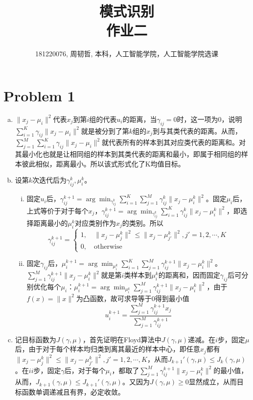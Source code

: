 \documentclass[a4paper,UTF8]{article}
\numberwithin{equation}{section}
\begin{document}
\title{模式识别\\
作业二}
\author{181220076, 周韧哲, 本科，人工智能学院，人工智能学院选课}
\maketitle

\section*{Problem 1}
\begin{enumerate}[(a)]
	\item $\|x_j-\mu_i\|^2$代表$x_j$到第$i$组的代表$u_i$的距离，当$\gamma_{ij}=0$时，这一项为$0$，说明$\sum_{i=1}^{K}\gamma_{ij}\|x_j-\mu_i\|^2$就是被分到了第$k$组的$x_j$到与其类代表的距离。从而，$\sum_{j=1}^{M}\sum_{i=1}^{K}\gamma_{ij}\|x_j-\mu_i\|^2$就代表所有的样本到其对应类代表的距离和。对其最小化也就是让相同组的样本到其类代表的距离和最小，即属于相同组的样本彼此相似，距离最小。所以该式形式化了K均值目标。
	\item 设第$k$次迭代后为$\gamma_{ij}^k,\mu_i^k$。
	\begin{enumerate}[i.]
		\item 固定$u_i$后，$\gamma_{ij}^{k+1} = \arg\min_{\gamma_{ij}^{k}} \sum_{i=1}^{K}\sum_{j=1}^{M}\gamma_{ij}^k\|x_j-\mu_i^k\|^2$。固定$\mu_i$后，上式等价于对于每个$x_j$，$\gamma_{ij}^{k+1} = \arg\min_{\gamma_{ij}^{k}} \sum_{i=1}^{K}\gamma_{ij}^k\|x_j-\mu_i^k\|^2$，即选择距离最小的$\mu_i^k$对应类别作为$x_j$的类别。所以
		$$\gamma_{ij}^{k+1} = \begin{cases}
			1,\quad\|x_j-\mu_j^{k}\|^2\leq \|x_j-\mu_{j'}^{k}\|^2,j'=1,2,\cdots,K \\
			0,\quad\text{otherwise}
		\end{cases}$$
		\item 固定$\gamma_{ij}$后，$\mu_i^{k+1} = \arg\min_{\mu_i^{k}} \sum_{i=1}^{K}\sum_{j=1}^{M}\gamma_{ij}^{k+1}\|x_j-\mu_i^k\|^2$。$\sum_{j=1}^{M}\gamma_{ij}^{k+1}\|x_j-\mu_i^k\|^2$就是第$i$类样本到$\mu_i^k$的距离和，因而固定$\gamma_{ij}$后可分别优化每个$\mu_i$：$\mu_i^{k+1}=\arg\min_{\mu_i^{k}} \sum_{j=1}^{M}\gamma_{ij}^{k+1}\|x_j-\mu_i^k\|^2$，由于$f(x)=\|x\|^2$为凸函数，故可求导等于0得到最小值$$u_i^{k+1}=\frac{\sum_{j=1}^{M}\gamma_{ij}^{k+1}x_j}{\sum_{j=1}^{M}\gamma_{ij}^{k+1}}$$
	\end{enumerate}
    \item 记目标函数为$J(\gamma,\mu)$，首先证明在Floyd算法中$J(\gamma,\mu)$递减。在$i$步，固定$\mu$后，由于对于每个样本均归类到离其最近的样本中心，即任意$x_j$都有$\|x_j-\mu_j^{k}\|^2\leq \|x_j-\mu_{j'}^{k}\|^2,j'=1,2,\cdots,K$，从而$J_{k+1}'(\gamma,\mu)\leq J_k(\gamma,\mu)$。在$ii$步，固定$\gamma$后，对于每个$\mu_i$，都取了$\sum_{j=1}^{M}\gamma_{ij}^{k+1}\|x_j-\mu_i^k\|^2$的最小值，从而，$J_{k+1}(\gamma,\mu)\leq J_{k+1}'(\gamma,\mu)$。又因为$J(\gamma,\mu)\geq 0$显然成立，从而目标函数单调递减且有界，必定收敛。
\end{enumerate}
\end{document}
